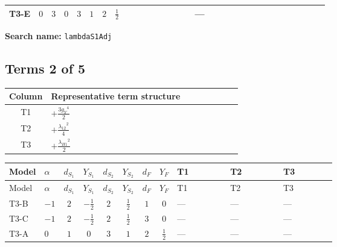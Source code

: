 \documentclass[8pt]{article}
\begin{document}
\begin{landscape}
\begin{longtable}{@{}llcccccc >{\raggedright\arraybackslash}p{0.21\linewidth} >{\raggedright\arraybackslash}p{0.21\linewidth} >{\raggedright\arraybackslash}p{0.21\linewidth}@{}}
\midrule
T3-E & $0$ & $3$ & $0$ & $3$ & $1$ & $2$ & $\frac{1}{2}$ & \scriptsize\adjustbox{max width=\linewidth}{$\begin{gathered} \frac{3 {g_2}^4}{4}\end{gathered}$} & --- & \scriptsize\adjustbox{max width=\linewidth}{$\begin{gathered} +{g_2}^2 (-3 {\lambda_{S_1}}-24 {\lambda_{S_1}^{\rm Adj}})\end{gathered}$} \\
\midrule
\bottomrule
\end{longtable}
\clearpage
\noindent\textbf{Search name: }\texttt{lambdaS1Adj}\par\smallskip
\subsection*{Terms 2 of 5}
\begin{center}
\begin{tabular}{@{}c >{\raggedright\arraybackslash}p{0.82\linewidth}@{}}
\toprule
Column & Representative term structure \\
\midrule
T1 & \(\displaystyle +\frac{3 {g_Y}^4}{2}\) \\
\midrule
T2 & \(\displaystyle +\frac{{\lambda_{12}}^2}{4}\) \\
\midrule
T3 & \(\displaystyle +\frac{{\lambda_{H1}}^2}{2}\) \\
\midrule
\bottomrule
\end{tabular}
\end{center}
\smallskip
\tiny
\begin{longtable}{@{}llcccccc >{\raggedright\arraybackslash}p{0.21\linewidth} >{\raggedright\arraybackslash}p{0.21\linewidth} >{\raggedright\arraybackslash}p{0.21\linewidth}@{}}
\toprule
Model & $\alpha$ & $d_{S_1}$ & $Y_{S_1}$ & $d_{S_2}$ & $Y_{S_2}$ & $d_F$ & $Y_F$ & T1 & T2 & T3 \\
\midrule
\endfirsthead
\toprule
Model & $\alpha$ & $d_{S_1}$ & $Y_{S_1}$ & $d_{S_2}$ & $Y_{S_2}$ & $d_F$ & $Y_F$ & T1 & T2 & T3 \\
\midrule
\endhead
T3-B & $-1$ & $2$ & $-\frac{1}{2}$ & $2$ & $\frac{1}{2}$ & $1$ & $0$ & --- & --- & --- \\
\midrule
T3-C & $-1$ & $2$ & $-\frac{1}{2}$ & $2$ & $\frac{1}{2}$ & $3$ & $0$ & --- & --- & --- \\
\midrule
T3-A & $0$ & $1$ & $0$ & $3$ & $1$ & $2$ & $\frac{1}{2}$ & --- & --- & --- \\
\midrule

\end{longtable}
\end{landscape}
\end{document}
